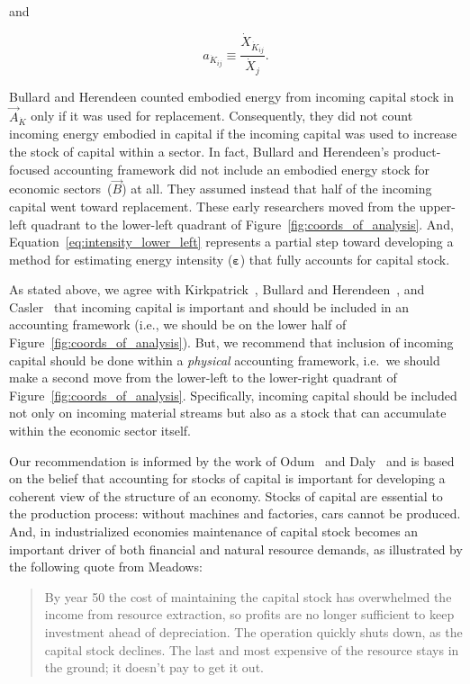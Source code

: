 \noindent{}and

\begin{equation}
	a_{\dot{K}_{ij}}
	\equiv
	\frac{\dot{X}_{\dot{K}_{ij}}}{\dot{X}_{j}}.
\end{equation}

Bullard and Herendeen
counted embodied energy 
from incoming capital stock in $\vec{A}_{\dot{K}}$ 
only if it was used
for replacement.\cite[p.~488]{Bullard-III:1975aa}
Consequently, they did not count incoming energy embodied 
in capital if the incoming capital was used 
to increase the stock of capital within a sector.
In fact, Bullard and Herendeen's
product-focused accounting framework
did not include an embodied energy stock 
for economic sectors~($\vec{B}$) at all.
They assumed instead that half of the incoming capital 
went toward replacement.
These early researchers moved from the upper-left quadrant
to the lower-left quadrant of Figure~\ref{fig:coords_of_analysis}.
And, Equation~\ref{eq:intensity_lower_left} represents 
a partial step toward developing 
a method for estimating energy intensity ($\boldsymbol{\varepsilon}$)
that fully accounts for capital stock.

As stated above, we agree with Kirkpatrick~\cite{Kirkpatrick:1974te}, 
Bullard and Herendeen~\cite{Bullard-III:1975aa},
and Casler~\cite{Casler:1983uy} that incoming capital
is important and should be included in an accounting framework
(i.e., we should be on the lower half of Figure~\ref{fig:coords_of_analysis}).
But, we recommend that inclusion of incoming capital should
be done within a \emph{physical} accounting framework, 
i.e.\ we should make a second move from the lower-left to the lower-right
quadrant of Figure~\ref{fig:coords_of_analysis}.
Specifically, incoming capital should be included 
not only on incoming material streams but also
as a stock that can accumulate within the economic sector itself.

Our recommendation is informed by the work of 
Odum~\cite{Odum1969} and Daly~\cite{Daly1995}
and is based on the belief that
accounting for stocks of capital is important 
for developing a coherent view
of the structure of an economy. 
Stocks of capital are essential to the production process:
without machines and factories, cars cannot be produced. 
And, in industrialized economies 
maintenance of capital stock becomes an important 
driver of both financial and natural resource demands,
as illustrated by the following quote from Meadows:

\begin{quote}
	By year 50 the cost of maintaining the capital stock 
	has overwhelmed the income from resource extraction, 
	so profits are no longer sufficient 
	to keep investment ahead of depreciation. 
	The operation quickly shuts down, 
	as the capital stock declines. 
	The last and most expensive of the resource stays in the ground; 
	it doesn't pay to get it out.\cite[p.~62]{Meadows2008}
\end{quote}

